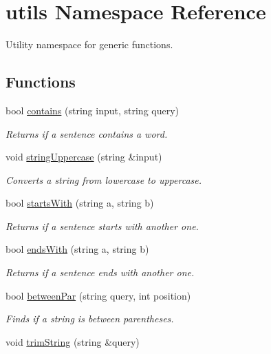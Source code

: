 \hypertarget{namespaceutils}{}\section{utils Namespace Reference}
\label{namespaceutils}


Utility namespace for generic functions.  


\subsection*{Functions}
\begin{DoxyCompactItemize}
\item 
bool \hyperlink{namespaceutils_a69c832543a093a8099189e4755695a62}{contains} (string input, string query)
\begin{DoxyCompactList}\small\item\em Returns if a sentence contains a word. \end{DoxyCompactList}\item 
void \hyperlink{namespaceutils_a4cc31521e740c9e31b4bfa8ee85eff46}{string\+Uppercase} (string \&input)
\begin{DoxyCompactList}\small\item\em Converts a string from lowercase to uppercase. \end{DoxyCompactList}\item 
bool \hyperlink{namespaceutils_ae840ea1b4ad4ce23c2b48158ac75d557}{starts\+With} (string a, string b)
\begin{DoxyCompactList}\small\item\em Returns if a sentence starts with another one. \end{DoxyCompactList}\item 
bool \hyperlink{namespaceutils_a57772e91d08481b38c47cda04479e169}{ends\+With} (string a, string b)
\begin{DoxyCompactList}\small\item\em Returns if a sentence ends with another one. \end{DoxyCompactList}\item 
bool \hyperlink{namespaceutils_a1e1de2e5772bffdfe2c8d3309a61ddab}{between\+Par} (string query, int position)
\begin{DoxyCompactList}\small\item\em Finds if a string is between parentheses. \end{DoxyCompactList}\item 
void \hyperlink{namespaceutils_a9f184d101ac739ab058355ab5413ca9a}{trim\+String} (string \&query)

\end{DoxyCompactItemize}
